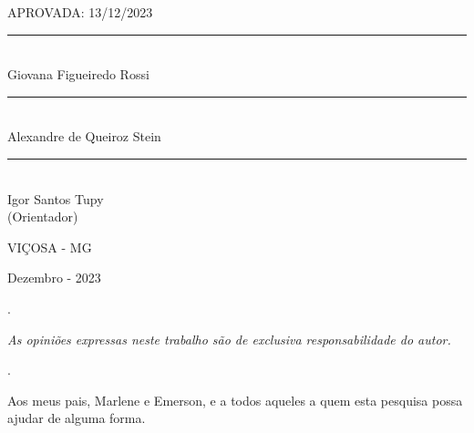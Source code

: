 \documentclass[a4paper,12pt]{article}
\newenvironment{invisible}{\color{white}}{}
\begin{document}
\vspace{1.0cm}

APROVADA: 13/12/2023

\vspace{1.0cm}

\begin{minipage}{0.45\textwidth}
    \centering
    \rule{6cm}{0.4pt} \\
    Giovana Figueiredo Rossi
\end{minipage}%
\hspace{0.1\textwidth}
\begin{minipage}{0.45\textwidth}
    \centering
    \rule{6cm}{0.4pt} \\
    Alexandre de Queiroz Stein
\end{minipage}

\vspace{2.0cm}

\centering
\rule{6cm}{0.4pt} \\
Igor Santos Tupy \\
(Orientador)

\vspace{2.0cm}

\begin{center}

VIÇOSA - MG

Dezembro - 2023
    
\end{center}

\newpage
\thispagestyle{empty}

\begin{invisible}
.
\end{invisible}

\vspace{28\baselineskip}

\textit{As opiniões expressas neste trabalho são de exclusiva responsabilidade do autor.}


\newpage
\pagestyle{fancy}

\begin{invisible}
.
\end{invisible}

\vspace{28\baselineskip}

\begin{adjustwidth}{7.5cm}{0cm}
    \justifying
    \singlespacing
    Aos meus pais, Marlene e Emerson, e a todos aqueles a quem esta
    pesquisa possa ajudar de alguma forma.
\end{adjustwidth}
\end{document}
